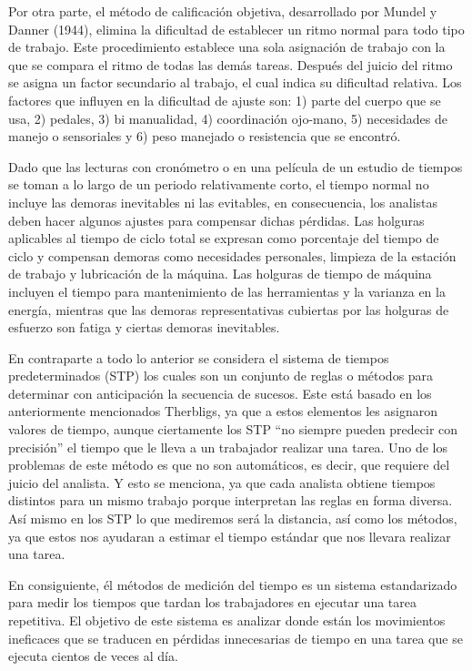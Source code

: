     
    Por otra parte, el método de calificación objetiva, desarrollado por Mundel y Danner (1944), elimina la dificultad de establecer un ritmo normal para todo tipo de trabajo. Este procedimiento establece una sola asignación de trabajo con la que se compara el ritmo de todas las demás tareas. Después del juicio del ritmo se asigna un factor secundario al trabajo, el cual indica su dificultad relativa. Los factores que influyen en la dificultad de ajuste son: 1) parte del cuerpo que se usa, 2) pedales, 3) bi manualidad, 4) coordinación ojo-mano, 5) necesidades de manejo o sensoriales y 6) peso manejado o resistencia que se encontró.\cite{niebel1980ingenieria}
    
    
        Dado que las lecturas con cronómetro o en una película de un estudio de tiempos se toman a lo largo de un periodo relativamente corto, el tiempo normal no incluye las demoras inevitables ni las evitables, en consecuencia, los analistas deben hacer algunos ajustes para compensar dichas pérdidas. Las holguras aplicables al tiempo de ciclo total se expresan como porcentaje del tiempo de ciclo y compensan demoras como necesidades personales, limpieza de la estación de trabajo y lubricación de la máquina. Las holguras de tiempo de máquina incluyen el tiempo para mantenimiento de las herramientas y la varianza en la energía, mientras que las demoras representativas cubiertas por las holguras de esfuerzo son fatiga y ciertas demoras inevitables. \cite{niebel1980ingenieria}
    
    
    En contraparte a todo lo anterior se considera el sistema de tiempos predeterminados (STP) los cuales son un conjunto de reglas o métodos para determinar con anticipación la secuencia de sucesos. Este está basado en los anteriormente mencionados Therbligs, ya que a estos elementos les asignaron valores de tiempo, aunque ciertamente los STP “no siempre pueden predecir con precisión” el tiempo que le lleva a un trabajador realizar una tarea. Uno de los problemas de este método es que no son automáticos, es decir, que requiere del juicio del analista. Y esto se menciona, ya que cada analista obtiene tiempos distintos para un mismo trabajo porque interpretan las reglas en forma diversa. Así mismo en los STP lo que mediremos será la distancia, así como los métodos, ya que estos nos ayudaran a estimar el tiempo estándar que nos llevara realizar una tarea. 
    
    En consiguiente, él métodos de medición del tiempo es un sistema estandarizado para medir los tiempos que tardan los trabajadores en ejecutar una tarea repetitiva. El objetivo de este sistema es analizar donde están los movimientos ineficaces que se traducen en pérdidas innecesarias de tiempo en una tarea que se ejecuta cientos de veces al día. \cite{DanielGrifol}
    
